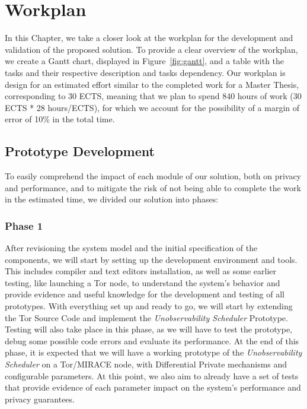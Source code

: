 
%

\chapter{Workplan}\label{cha:workplan}

In this Chapter, we take a closer look at the workplan for the development and validation of the proposed solution.
To provide a clear overview of the workplan, we create a Gantt chart, displayed in Figure~\ref{fig:gantt}, and a table with the tasks and their respective description and tasks dependency. Our workplan is design for an estimated effort similar to the completed work for a Master Thesis, corresponding to 30 ECTS, meaning that we plan to spend 840 hours of work (30 ECTS * 28 hours/ECTS), for which we account for the possibility of a margin of error of 10\% in the total time. 

\section{Prototype Development}
To easily comprehend the impact of each module of our solution, both on privacy and performance, and to mitigate the risk of not being able to complete the work in the estimated time, we divided our solution into phases:

\subsection{Phase 1}
After revisioning the system model and the initial specification of the components, we will start by setting up the development environment and tools. This includes compiler and text editors installation, as well as some earlier testing, like launching a Tor node, to understand the system's behavior and provide evidence and useful knowledge for the development and testing of all prototypes. With everything set up and ready to go, we will start by extending the Tor Source Code and implement the \textit{Unobservability Scheduler} Prototype. Testing will also take place in this phase, as we will have to test the prototype, debug some possible code errors and evaluate its performance. At the end of this phase, it is expected that we will have a working prototype of the \textit{Unobservability Scheduler} on a Tor/MIRACE node, with Differential Private mechanisms and configurable parameters. At this point, we also aim to already have a set of tests that provide evidence of each parameter impact on the system's performance and privacy guarantees.

